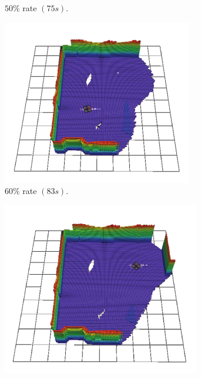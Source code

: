 \documentclass[11pt,openany]{book}
\begin{document}
\begin{figure}[H]
\begin{subfigure}[H]{0.3\linewidth}
        \caption{{$50\%$ rate $(75s).$}}
        \label{fig:3.13e}
    \end{subfigure}
    \begin{subfigure}[H]{0.3\linewidth}
        \centering
        \includegraphics[width=\linewidth]{assets/3_13_f.png}
        \caption{{$60\%$ rate $(83s).$}}
        \label{fig:3.13f}
    \end{subfigure}
    \begin{subfigure}[H]{0.3\linewidth}
        \centering
        \includegraphics[width=\linewidth]{assets/3_13_g.png}

\end{subfigure}
\end{figure}
\end{document}
